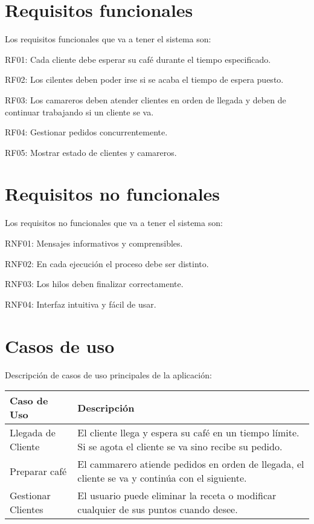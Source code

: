 \documentclass[a4paper,12pt]{article}
\begin{document}
\section{Requisitos funcionales}
Los requisitos funcionales que va a tener el sistema son:

RF01: Cada cliente debe esperar su café durante el tiempo especificado.

RF02: Los cilentes deben poder irse si se acaba el tiempo de espera puesto.

RF03: Los camareros deben atender clientes en orden de llegada y deben de continuar trabajando si un cliente se va.

RF04: Gestionar pedidos concurrentemente.

RF05: Mostrar estado de clientes y camareros.

\section{Requisitos no funcionales}
Los requisitos no funcionales que va a tener el sistema son:

RNF01: Mensajes informativos y comprensibles.

RNF02: En cada ejecución el proceso debe ser distinto.

RNF03: Los hilos deben finalizar correctamente.

RNF04: Interfaz intuitiva y fácil de usar.

\section{Casos de uso}
Descripción de casos de uso principales de la aplicación:

\begin{tabular}{|l|p{10cm}|}
    \hline
    Caso de Uso & Descripción \\ \hline
    Llegada de Cliente & El cliente llega y espera su café en un tiempo límite. Si se agota el cliente se va sino recibe su pedido. \\ \hline
    Preparar café & El cammarero atiende pedidos en orden de llegada, el cliente se va y continúa con el siguiente. \\ \hline
    Gestionar Clientes & El usuario puede eliminar la receta o modificar cualquier de sus puntos cuando desee. \\ \hline
\end{tabular}
\end{document}

